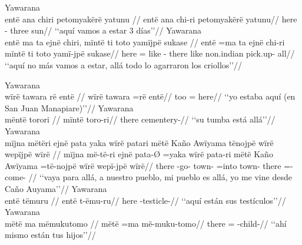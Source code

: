 \documentclass{memoir}
\begin{document}
        \endgl 
    \a Yawarana\\
    \label{ctovarmafl-40}        \begingl
        \glpreamble entë ana chiri petomyakërë yatunu //
        \gla entë ana chi-ri petomyakërë yatunu//
        \glb here  - three sun//
            \glft ‘‘aquí vamos a estar 3 días’’//  
        \endgl 
    \a Yawarana\\
    \label{histyarirdi-674}        \begingl
        \glpreamble entë ma ta ejnë chiri, mïntë ti toto yamïjpë sukase //
        \gla entë =ma ta ejnë chi-ri mïntë ti toto yamï-jpë sukase//
        \glb here = like  - there like non.indian pick.up- all//
            \glft ‘‘aquí no más vamos a estar, allá todo lo agarraron los criollos’’//  
        \endgl 
\xe

\pex\label{loc-main-aff-part-nsubj}    \a Yawarana\\
    \label{histanfo-1}        \begingl
        \glpreamble wïrë tawara rë entë //
        \gla wïrë tawara =rë entë//
        \glb {} too = here//
            \glft ‘‘yo estaba aquí (en San Juan Manapiare)’’//  
        \endgl 
    \a Yawarana\\
    \label{histgrme-3}        \begingl
        \glpreamble mëntë torori //
        \gla mïntë toro-ri//
        \glb there cementery-//
            \glft ‘‘su tumba está allá’’//  
        \endgl 
    \a Yawarana\\
    \label{histgrme-67}        \begingl
        \glpreamble mïjna mëtëri ejnë pata yaka wïrë patari mëtë Kaño Awïyama tënojpë wïrë wepïjpë wïrë //
        \gla mïjna më-të-ri ejnë pata-Ø =yaka wïrë pata-ri mëtë Kaño Awïyama =të-nojpë wïrë wepï-jpë wïrë//
        \glb there -go-  town- =into  town- there   =-  come- //
            \glft ‘‘vaya para allá, a nuestro pueblo, mi pueblo es allá, yo me vine desde Caño Auyama’’//  
        \endgl 
    \a Yawarana\\
    \label{convinsectmaj-33}        \begingl
        \glpreamble entë tëmuru //
        \gla entë t-ëmu-ru//
        \glb here -testicle-//
            \glft ‘‘aquí están sus testículos’’//  
        \endgl 
    \a Yawarana\\
    \label{convamgu-35}        \begingl
        \glpreamble mëtë ma mëmukutomo //
        \gla mëtë =ma më-muku-tomo//
        \glb there = -child-//
            \glft ‘‘ahí mismo están tus hijos’’//  
\end{document}

